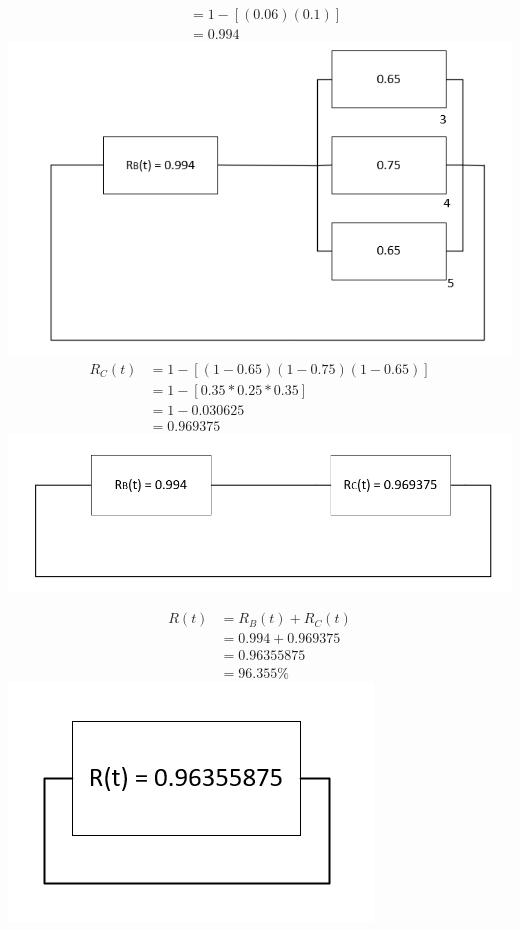 \documentclass[]{article}
\begin{document}
\begin{itemize}
\begin{align*}
			&=1-[(0.06)(0.1)]\\
			&=0.994
		\end{align*}
		\includegraphics[scale=0.5]{Rb}
		\begin{align*}
			R_{C}(t)&=1-[(1-0.65)(1-0.75)(1-0.65)]\\
			&=1-[0.35*0.25*0.35]\\
			&=1-0.030625\\
			&=0.969375
		\end{align*}
		\includegraphics[scale=0.5]{Rc}
		
		\begin{align*}
			R(t)&=R_B(t) + R_C(t)\\
			&=0.994+0.969375\\
			&=0.96355875\\
			&=96.355\%
		\end{align*}
		\includegraphics[scale=0.5]{Rt}\\
		

\end{itemize}
\end{document}
